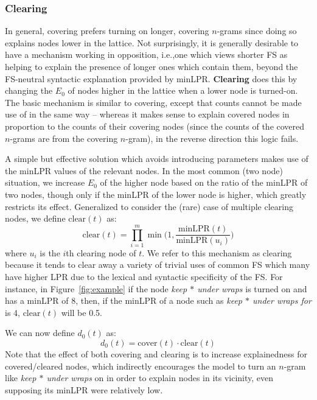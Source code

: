 \documentclass[11pt,letterpaper]{article}
\makeatletter
\def \ie {i.e.,\@ }
\newcommand{\gap}{$*$\xspace}
\newcommand{\ex}[1]{\textit{#1}\xspace}
\newcommand{\termdef}[1]{\textbf{#1}\xspace}
\newcommand{\minLPR}{\ensuremath{\text{minLPR}}}
\newcommand{\cover}{\ensuremath{\text{cover}}\xspace}
\newcommand{\clear}{\ensuremath{\text{clear}}\xspace}
\newcommand{\figref}[2][]{Figure#1~\ref{#2}\xspace}
\makeatother
\begin{document}
\subsubsection{Clearing}

In general, covering prefers turning on longer, covering $n$-grams since doing so explains nodes lower in the lattice. Not surprisingly, it is generally desirable to have a mechanism working in opposition, \ie one which views shorter FS as helping to explain the presence of longer ones which contain them, beyond the FS-neutral syntactic explanation provided by minLPR. \termdef{Clearing} does this by changing the $E_0$ of nodes higher in the lattice when a lower node is turned-on. The basic mechanism is similar to covering, except that counts cannot be made use of in the same way -- whereas it makes sense to explain covered nodes in proportion to the counts of their covering nodes (since the counts of the covered $n$-grams are from the covering $n$-gram), in the reverse direction this logic fails. 

A simple but effective solution which avoids introducing parameters makes use of the minLPR values of the relevant nodes. In the most common (two node) situation, we increase $E_{0}$ of the higher node based on the ratio of the minLPR of two nodes, though only if the minLPR of the lower node is higher, which greatly restricts its effect. Generalized to consider the (rare) case of multiple clearing nodes, we define $\clear(t)$ as:
\begin{displaymath}
\clear(t) = \prod_{i=1}^{m}{\min\Big(1,\frac{\minLPR(t)}{\minLPR(u_i)}\Big)}
\end{displaymath}
where $u_i$ is the $i$th clearing node of $t$. We refer to this mechanism as clearing because it tends to clear away a variety of trivial uses of common FS which many have higher LPR due to the lexical and syntactic specificity of the FS. For instance, in \figref{fig:example} if the node \ex{keep \gap under wraps}  is turned on and has a minLPR of 8, then, if the minLPR of a node such as \ex{keep \gap under wraps for} is 4, $\clear(t)$ will be 0.5. 

We can now define $d_{0}(t)$ as:
\begin{displaymath}
d_0(t) = \cover(t) \cdot \clear(t)
\end{displaymath}
Note that the effect of both covering and clearing is to  increase explainedness for covered/cleared nodes, which indirectly encourages the model to turn an $n$-gram like \ex{keep \gap under wraps} on in order to explain nodes in its vicinity, even supposing its minLPR were relatively low.
\end{document}
